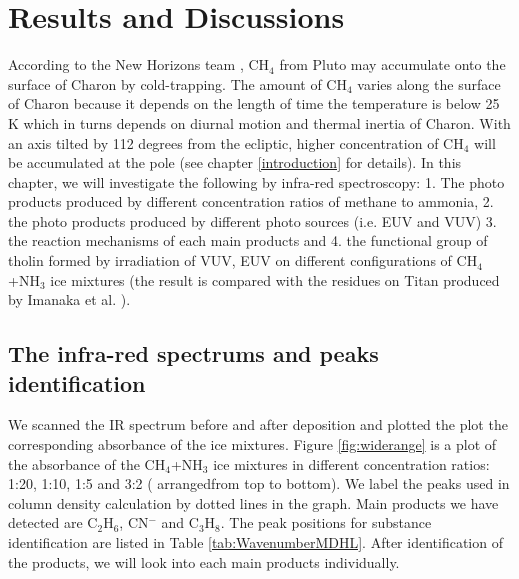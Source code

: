 \chapter{\protect Results and Discussions}
\label{results}
According to the New Horizons team \cite{grundy2016formation}, CH$_4$ from Pluto may accumulate onto the surface of Charon by cold-trapping. The amount of CH$_4$ varies along the surface of Charon because it depends on the length of time the temperature is below 25 K which in turns depends on diurnal motion and thermal inertia of Charon. With an axis tilted by 112 degrees from the ecliptic, higher concentration of CH$_4$ will be accumulated at the pole (see chapter \ref{introduction} for details). In this chapter, we will investigate the following by infra-red spectroscopy: 1. The photo products produced by different concentration ratios of methane to ammonia, 2. the photo products produced by different photo sources (i.e. EUV and VUV) 3. the reaction mechanisms of each main products and 4. the functional group of tholin formed by irradiation of VUV, EUV on different configurations of CH$_4$+NH$_3$ ice mixtures (the result is compared with the residues on Titan produced by Imanaka et al. \cite{imanaka2004laboratory}).

\section{The infra-red spectrums and peaks identification}
We scanned the IR spectrum before and after deposition and plotted the plot the corresponding absorbance of the ice mixtures. Figure \ref{fig:widerange} is a plot of the absorbance of the CH$_4$+NH$_3$ ice mixtures in different concentration ratios: 1:20, 1:10, 1:5 and 3:2 ( arrangedfrom top to bottom). We label the peaks used in column density calculation  by dotted lines in  the graph. Main products we have detected are C$_2$H$_6$, CN$^-$ and C$_3$H$_8$. The peak positions for substance identification are listed in Table \ref{tab:WavenumberMDHL}. After identification of the products, we will look into each main products individually.\\

